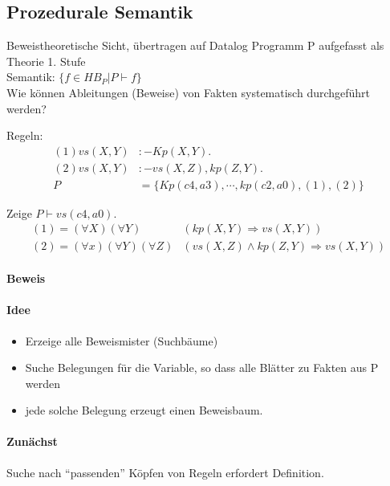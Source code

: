 \documentclass[12pt, a4paper]{article}
\begin{document}


\subsection{Prozedurale Semantik}
Beweistheoretische Sicht, übertragen auf Datalog Programm P aufgefasst als Theorie 1. Stufe \\
Semantik: $\{f \in HB_P | P \vdash f \}$ \\
Wie können Ableitungen (Beweise) von Fakten systematisch durchgeführt werden?

Regeln: 
\begin{equation}
\begin{split}
(1) vs(X, Y) &:- Kp(X, Y). \\
(2) vs(X, Y) &:- vs(X, Z), kp(Z, Y). \\
P &= \{ Kp (c4, a3), \cdots, kp(c2, a0), (1), (2) \} 
\end{split}
\end{equation}

Zeige $P \vdash vs(c4, a0)$. 
\begin{equation}
\begin{split}
(1) = (\forall X)(\forall Y)&(kp(X, Y) \Rightarrow vs(X, Y)) \\
(2) = (\forall x)(\forall Y)(\forall Z)&(vs(X, Z) \wedge kp(Z , Y) \Rightarrow vs(X, Y))
\end{split}
\end{equation}

\paragraph{Beweis}

\paragraph{Idee} 

\begin{itemize}
\item Erzeige alle Beweismister (Suchbäume)
\item Suche Belegungen für die Variable, so dass alle Blätter zu Fakten aus P werden
\item jede solche Belegung erzeugt einen Beweisbaum.
\end{itemize}

\paragraph{Zunächst} Suche nach ``passenden'' Köpfen von Regeln erfordert Definition.
\end{document}
